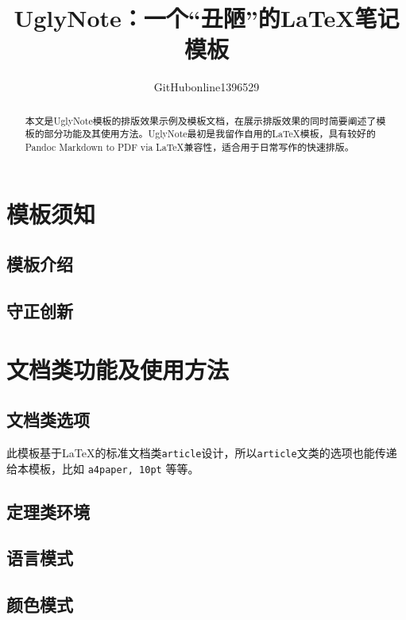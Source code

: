 \documentclass[12pt, blue]{uglynote}
\title{\bfseries UglyNote：一个“丑陋”的\LaTeX{}笔记模板}
\author{GitHubonline1396529}
\date{\zhdate{2022/12/31}}
\begin{document}
\maketitle
\begin{abstract}
    本文是UglyNote模板的排版效果示例及模板文档，在展示排版效果的同时简要阐述了模板的部分功能及其使用方法。UglyNote最初是我留作自用的\LaTeX 模板，具有较好的Pandoc Markdown to PDF via \LaTeX 兼容性，适合用于日常写作的快速排版。

\end{abstract}

\section{模板须知}
\subsection{模板介绍}


\subsection{守正创新}


\section{文档类功能及使用方法}
\subsection{文档类选项}\label{ssec:classoptions}

此模板基于\LaTeX{}的标准文档类\texttt{article}设计，所以\texttt{article}文类的选项也能传递给本模板，比如 \texttt{a4paper, 10pt} 等等。



\subsection{定理类环境}


\subsection{语言模式}


\subsection{颜色模式}\label{ssec:colors}

\end{document}
